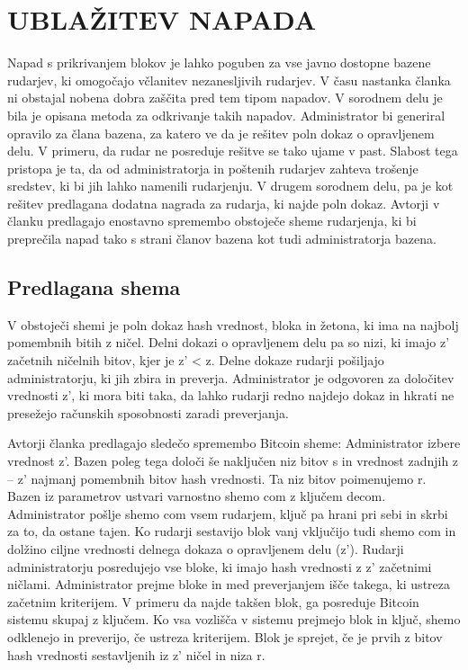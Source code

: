 \documentclass{acm_proc_article-sp}
\begin{document}
\section{UBLAŽITEV NAPADA} \label{sekcija3}
Napad s prikrivanjem blokov je lahko poguben za vse javno dostopne bazene rudarjev, ki omogočajo včlanitev nezanesljivih rudarjev. V času nastanka članka ni obstajal nobena dobra zaščita pred tem tipom napadov. V sorodnem delu je bila je opisana metoda za odkrivanje takih napadov. Administrator bi generiral opravilo za člana bazena, za katero ve da je rešitev poln dokaz o opravljenem delu. V primeru, da rudar ne posreduje rešitve se tako ujame v past. Slabost tega pristopa je ta, da od administratorja in poštenih rudarjev zahteva trošenje sredstev, ki bi jih lahko namenili rudarjenju. V drugem sorodnem delu, pa je kot rešitev predlagana dodatna nagrada za rudarja, ki najde poln dokaz.
Avtorji v članku predlagajo enostavno spremembo obstoječe sheme rudarjenja, ki  bi preprečila napad tako s strani članov bazena kot tudi administratorja bazena.


\subsection{Predlagana shema}
V obstoječi shemi je poln dokaz hash vrednost, bloka in žetona, ki ima na najbolj pomembnih bitih z ničel. Delni dokazi o opravljenem delu pa so nizi, ki imajo z' začetnih ničelnih bitov, kjer je z' < z.
Delne dokaze rudarji pošiljajo administratorju, ki jih zbira in preverja. Administrator je odgovoren za določitev vrednosti z', ki mora biti taka, da lahko rudarji redno najdejo dokaz in hkrati ne presežejo računskih sposobnosti zaradi preverjanja.
 
Avtorji članka predlagajo sledečo spremembo Bitcoin sheme:
Administrator izbere vrednost z'. Bazen poleg tega določi še naključen niz bitov s in vrednost zadnjih z – z' najmanj pomembnih bitov hash vrednosti. Ta niz bitov poimenujemo r.
Bazen iz parametrov ustvari varnostno shemo com z ključem decom. Administrator pošlje shemo com vsem rudarjem, ključ pa hrani pri sebi in skrbi za to, da ostane tajen. Ko rudarji sestavijo blok vanj vključijo tudi shemo com in dolžino ciljne vrednosti delnega dokaza o opravljenem delu (z'). Rudarji administratorju posredujejo vse bloke, ki imajo hash vrednosti z z' začetnimi ničlami. Administrator prejme bloke in med preverjanjem išče takega, ki ustreza začetnim kriterijem. V primeru da najde takšen blok, ga posreduje Bitcoin sistemu skupaj z ključem. Ko vsa vozlišča v sistemu prejmejo blok in ključ, shemo odklenejo in preverijo, če ustreza kriterijem. Blok je sprejet, če je prvih z bitov hash vrednosti sestavljenih iz z' ničel in niza r.
 
\end{document}
